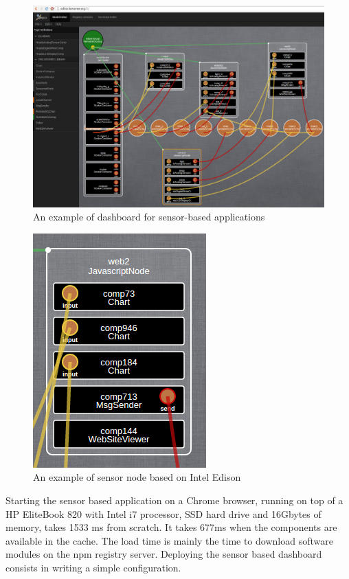 \begin{figure}[t]
	\centering
	\includegraphics[width=1\linewidth]{figures/fig1}
	\caption{An example of dashboard for sensor-based applications}
	\label{fig:fig3}
\end{figure}


\begin{figure}[t]
	\centering
	\includegraphics[width=0.5\linewidth]{figures/fig2}
	\caption{An example of sensor node based on Intel Edison}
	\label{fig:fig4}
\end{figure}


Starting the sensor based application on a Chrome browser, running on top of a HP EliteBook 820 with Intel i7 processor, SSD hard drive and 16Gbytes of memory, takes 1533 ms from scratch. It takes 677ms when the components are available in the cache. The load time is mainly the time to download software modules on the npm registry server. Deploying the sensor based dashboard consists in writing a simple configuration.

